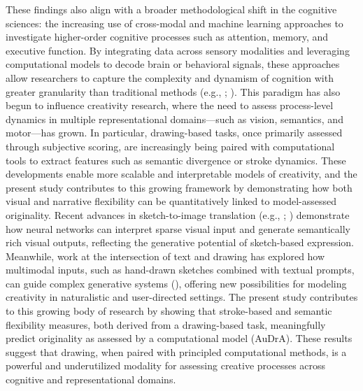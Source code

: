 \documentclass[../MA_Thesis.tex]{subfiles}
\begin{document}
These findings also align with a broader methodological shift in the cognitive sciences: the increasing use of cross-modal and machine learning approaches to investigate higher-order cognitive processes such as attention, memory, and executive function. By integrating data across sensory modalities and leveraging computational models to decode brain or behavioral signals, these approaches allow researchers to capture the complexity and dynamism of cognition with greater granularity than traditional methods (e.g., \cite{ye_self-supervised_2024}; \cite{vessel_default-mode_2019}). This paradigm has also begun to influence creativity research, where the need to assess process-level dynamics in multiple representational domains—such as vision, semantics, and motor—has grown. In particular, drawing-based tasks, once primarily assessed through subjective scoring, are increasingly being paired with computational tools to extract features such as semantic divergence or stroke dynamics. These developments enable more scalable and interpretable models of creativity, and the present study contributes to this growing framework by demonstrating how both visual and narrative flexibility can be quantitatively linked to model-assessed originality. Recent advances in sketch-to-image translation (e.g., \cite{ghosh_interactive_2019}; \cite{wang_diffsketching_2023}) demonstrate how neural networks can interpret sparse visual input and generate semantically rich visual outputs, reflecting the generative potential of sketch-based expression. Meanwhile, work at the intersection of text and drawing has explored how multimodal inputs, such as hand-drawn sketches combined with textual prompts, can guide complex generative systems (\cite{chen_control3d_2023}), offering new possibilities for modeling creativity in naturalistic and user-directed settings. The present study contributes to this growing body of research by showing that stroke-based and semantic flexibility measures, both derived from a drawing-based task, meaningfully predict originality as assessed by a computational model (AuDrA). These results suggest that drawing, when paired with principled computational methods, is a powerful and underutilized modality for assessing creative processes across cognitive and representational domains.
\end{document}
